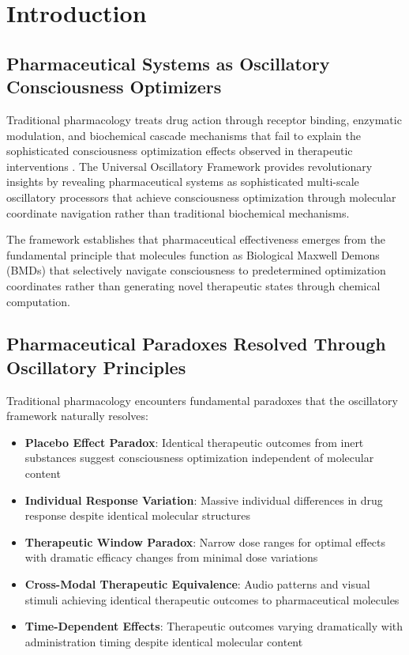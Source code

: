\documentclass[12pt,a4paper]{article}
\begin{document}
\section{Introduction}

\subsection{Pharmaceutical Systems as Oscillatory Consciousness Optimizers}

Traditional pharmacology treats drug action through receptor binding, enzymatic modulation, and biochemical cascade mechanisms that fail to explain the sophisticated consciousness optimization effects observed in therapeutic interventions \cite{brunton2017goodman}. The Universal Oscillatory Framework \cite{sachikonye2024mathematical,sachikonye2024physical} provides revolutionary insights by revealing pharmaceutical systems as sophisticated multi-scale oscillatory processors that achieve consciousness optimization through molecular coordinate navigation rather than traditional biochemical mechanisms.

The framework establishes that pharmaceutical effectiveness emerges from the fundamental principle that molecules function as Biological Maxwell Demons (BMDs) that selectively navigate consciousness to predetermined optimization coordinates rather than generating novel therapeutic states through chemical computation.

\subsection{Pharmaceutical Paradoxes Resolved Through Oscillatory Principles}

Traditional pharmacology encounters fundamental paradoxes that the oscillatory framework naturally resolves:

\begin{itemize}
\item \textbf{Placebo Effect Paradox}: Identical therapeutic outcomes from inert substances suggest consciousness optimization independent of molecular content
\item \textbf{Individual Response Variation}: Massive individual differences in drug response despite identical molecular structures
\item \textbf{Therapeutic Window Paradox}: Narrow dose ranges for optimal effects with dramatic efficacy changes from minimal dose variations
\item \textbf{Cross-Modal Therapeutic Equivalence}: Audio patterns and visual stimuli achieving identical therapeutic outcomes to pharmaceutical molecules
\item \textbf{Time-Dependent Effects}: Therapeutic outcomes varying dramatically with administration timing despite identical molecular content
\end{itemize}
\end{document}
